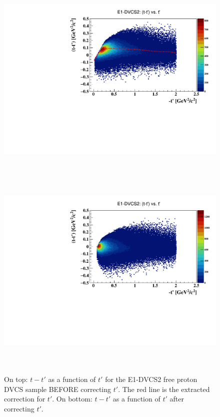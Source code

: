 \documentclass[a4paper,11pt,twoside]{article}
\begin{document}
\begin{figure}[h!]
\centering
\includegraphics[height=10.0cm]{fig/before_corrections_tprimet_t_InCoh.pdf}
\includegraphics[height=10.0cm]{fig/after_corrections_tprimet_t_InCoh.pdf}
\caption{On top: $t-t'$ as a function of $t'$ for the E1-DVCS2 free proton DVCS 
sample BEFORE correcting $t'$. The red line is the extracted correction for 
$t'$. On bottom: $t-t'$ as a function of $t'$ after correcting $t'$.}
\label{fig:corrections_tprime_e1dvcs2}
\end{figure}
\end{document}
